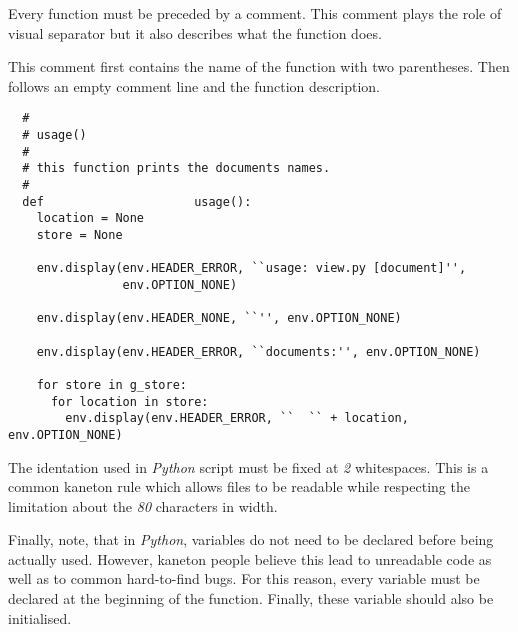 Every function must be preceded by a comment. This comment plays the role
of visual separator but it also describes what the function does.

This comment first contains the name of the function with two parentheses.
Then follows an empty comment line and the function description.

\begin{verbatim}
  #
  # usage()
  #
  # this function prints the documents names.
  #
  def                     usage():
    location = None
    store = None

    env.display(env.HEADER_ERROR, ``usage: view.py [document]'',
                env.OPTION_NONE)

    env.display(env.HEADER_NONE, ``'', env.OPTION_NONE)

    env.display(env.HEADER_ERROR, ``documents:'', env.OPTION_NONE)

    for store in g_store:
      for location in store:
        env.display(env.HEADER_ERROR, ``  `` + location, env.OPTION_NONE)
\end{verbatim}

The identation used in \textit{Python} script must be fixed at \textit{2}
whitespaces. This is a common kaneton rule which allows files to be
readable while respecting the limitation about the \textit{80} characters
in width.

Finally, note, that in \textit{Python}, variables do not need to be declared
before being actually used. However, kaneton people believe this lead
to unreadable code as well as to common hard-to-find bugs. For this reason,
every variable must be declared at the beginning of the function. Finally,
these variable should also be initialised.
